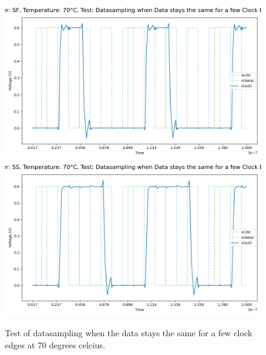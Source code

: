 \begin{figure}[H]
    \vspace{5pt}
    \includegraphics[height= 0.21\textheight]{figures/aimspice/SF/70/W3.csv.png}
    \vspace{5pt}
    \includegraphics[height= 0.21\textheight]{figures/aimspice/SS/70/W3.csv.png}
    \caption{Test of datasampling when the data stays the same for a few clock edges at 70 degrees celcius.}
    \label{fig:aimspice_W3_70}
\end{figure}

\pagebreak


